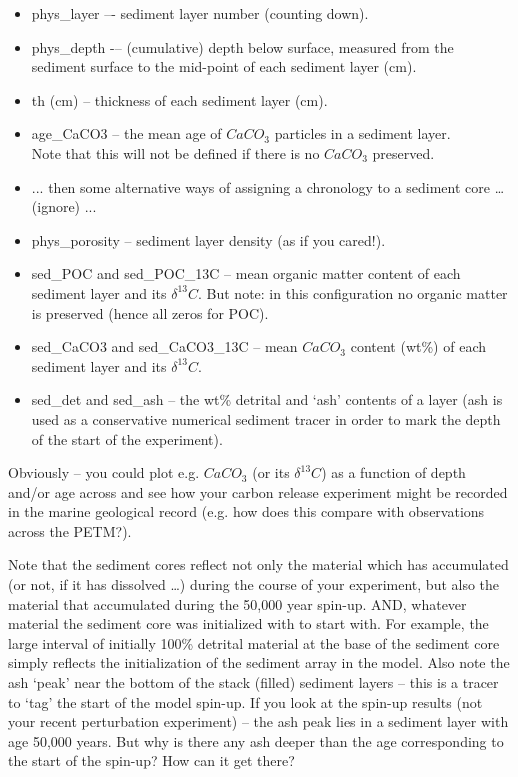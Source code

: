 \documentclass[11pt,fleqn]{book} %
\begin{document}
\vspace{1mm}
\begin{itemize}[noitemsep]
\item \textsf{\footnotesize phys\_layer } –- sediment layer number (counting down).
\item \textsf{\footnotesize phys\_depth } -– (cumulative) depth below surface, measured from the sediment surface to the mid-point of each sediment layer (cm).
\item \textsf{\footnotesize th (cm) } -- thickness of each sediment layer (cm).
\item \textsf{\footnotesize age\_CaCO3 } -- the mean age of \(CaCO_{3}\) particles in a sediment layer. 
\\Note that this will not be defined if there is no \(CaCO_{3}\) preserved.
\item \textsf{\footnotesize ... } then some alternative ways of assigning a chronology to a sediment core … (ignore) ...
\item \textsf{\footnotesize phys\_porosity  } -- sediment layer density (as if you cared!).
\item \textsf{\footnotesize sed\_POC } and \textsf{\footnotesize sed\_POC\_13C } -- mean organic matter content of each sediment layer and its \(\delta^{13} C\). But note: in this configuration no organic matter is preserved (hence all zeros for POC).
\item \textsf{\footnotesize sed\_CaCO3} and \textsf{\footnotesize sed\_CaCO3\_13C } -- mean \(CaCO_{3}\) content (wt\%) of each sediment layer and its \(\delta^{13} C\).
\item \textsf{\footnotesize sed\_det } and \textsf{\footnotesize sed\_ash } -- the wt\% detrital and ‘ash’ contents of a layer (ash is used as a conservative numerical sediment tracer in order to mark the depth of the start of the experiment).
\end{itemize}
\vspace{1mm}

Obviously – you could plot e.g. \(CaCO_{3}\) (or its \(\delta^{13}C\)) as a function of depth and/or age across and see how your carbon release experiment might be recorded in the marine geological record (e.g. how does this compare with observations across the PETM?).

Note that the sediment cores reflect not only the material which has accumulated (or not, if it has dissolved …) during the course of your experiment, but also the material that accumulated during the 50,000 year spin-up. AND, whatever material the sediment core was initialized with to start with. For example, the large interval of initially 100\% detrital material at the base of the sediment core  simply reflects the initialization of the sediment array in the model. Also note the ash ‘peak’ near the bottom of the stack (filled) sediment layers – this is a tracer to ‘tag’ the start of the model spin-up. If you look at the spin-up results (not your recent perturbation experiment) – the ash peak lies in a sediment layer with age 50,000 years. But why is there any ash deeper than the age corresponding to the start of the spin-up? How can it get there?
\end{document}
